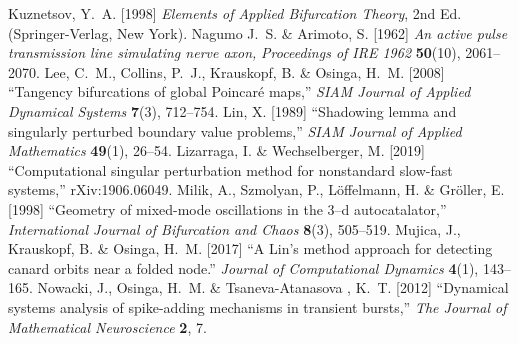 \documentclass{ws-ijbc}
\begin{document}
\begin{thebibliography}{46}
Kuznetsov, Y.~A. [1998]
\newblock \emph{Elements of Applied Bifurcation Theory}, 2nd Ed.
\newblock (Springer-Verlag, New York).
% 
Nagumo J.~S. \& Arimoto, S. [1962]
\newblock \emph{An active pulse transmission line simulating nerve axon,} 
\newblock \emph{Proceedings of IRE 1962} \textbf{50}(10), 2061--2070.
%
Lee, C.~M., Collins, P.~J., Krauskopf, B. \& Osinga, H.~M. [2008]
\newblock \enquote{Tangency bifurcations of global {P}oincar{\'e} maps,}
\newblock \emph{SIAM Journal of Applied Dynamical Systems} \textbf{7}(3),  712--754.
% 
Lin, X. [1989]
\newblock \enquote{Shadowing lemma and singularly perturbed boundary value problems,}
\newblock \emph{SIAM Journal of Applied Mathematics} \textbf{49}(1),  26--54.
%
Lizarraga, I. \& Wechselberger, M. [2019]
\newblock \enquote{Computational singular perturbation method for nonstandard slow-fast systems,}
rXiv:1906.06049.
%
% 
Milik, A., Szmolyan, P., L{\"o}ffelmann, H. \& Gr{\"o}ller, E. [1998]
\newblock \enquote{Geometry of mixed-mode oscillations in the 3--d autocatalator,}
\newblock \emph{International Journal of Bifurcation and Chaos} \textbf{8}(3),  505--519.
%
% 
Mujica, J., Krauskopf, B. \& Osinga, H.~M. [2017]
\newblock \enquote{{A {L}in's method approach for detecting canard orbits near a folded node}.}
\newblock \emph{Journal of Computational Dynamics} \textbf{4}(1),  143--165.
%
Nowacki, J., Osinga, H.~M. \& Tsaneva-Atanasova , K.~T. [2012]
\newblock \enquote{Dynamical systems analysis of spike-adding mechanisms in transient bursts,}
\newblock \emph{The Journal of Mathematical Neuroscience} \textbf{2}, 7.
%

\end{thebibliography}
\end{document}
